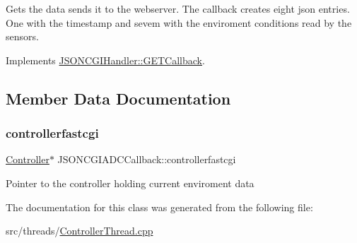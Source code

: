 Gets the data sends it to the webserver. The callback creates eight json entries. One with the timestamp and sevem with the enviroment conditions read by the sensors. 

Implements \hyperlink{classJSONCGIHandler_1_1GETCallback_a2367bf5a5912e9e5599ee464e0846255}{J\+S\+O\+N\+C\+G\+I\+Handler\+::\+G\+E\+T\+Callback}.



\subsection{Member Data Documentation}
\mbox{\label{classJSONCGIADCCallback_a3f832c3bdcddd67e1ab4daa225531b2e}} 
\subsubsection{\texorpdfstring{controllerfastcgi}{controllerfastcgi}}
{\footnotesize\ttfamily \hyperlink{classController}{Controller}$\ast$ J\+S\+O\+N\+C\+G\+I\+A\+D\+C\+Callback\+::controllerfastcgi\hspace{0.3cm}{\ttfamily [private]}}

Pointer to the controller holding current enviroment data 

The documentation for this class was generated from the following file\+:\begin{DoxyCompactItemize}
\item 
src/threads/\hyperlink{ControllerThread_8cpp}{Controller\+Thread.\+cpp}\end{DoxyCompactItemize}
